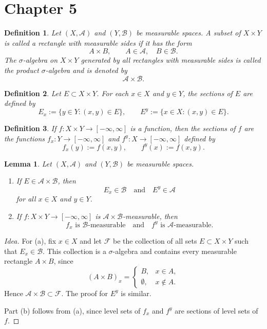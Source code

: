 \documentclass[12pt]{article}
\newtheorem{lemma}{Lemma}
\newtheorem{definition}{Definition}
\begin{document}
\section*{Chapter 5}

\begin{definition}
Let $(X,\mathcal{A})$ and $(Y,\mathcal{B})$ be measurable spaces. A subset of
$X\times Y$ is called a \emph{rectangle with measurable sides} if it has the
form
\[
A\times B,
\qquad A\in\mathcal{A},\quad B\in\mathcal{B}.
\]
The $\sigma$-algebra on $X\times Y$ generated by all rectangles with measurable
sides is called the \emph{product $\sigma$-algebra} and is denoted by
\[
\mathcal{A}\times\mathcal{B}.
\]
\end{definition}

\begin{definition}
Let $E\subset X\times Y$. For each $x\in X$ and $y\in Y$, the \emph{sections}
of $E$ are defined by
\[
E_x:=\{y\in Y:(x,y)\in E\},
\qquad
E^y:=\{x\in X:(x,y)\in E\}.
\]
\end{definition}

\begin{definition}
If $f:X\times Y\to[-\infty,\infty]$ is a function, then the \emph{sections} of
$f$ are the functions $f_x:Y\to[-\infty,\infty]$ and
$f^y:X\to[-\infty,\infty]$ defined by
\[
f_x(y):=f(x,y),
\qquad
f^y(x):=f(x,y).
\]
\end{definition}

\begin{lemma}
Let $(X,\mathcal{A})$ and $(Y,\mathcal{B})$ be measurable spaces.
\begin{enumerate}[label=(\alph*)]
    \item If $E\in\mathcal{A}\times\mathcal{B}$, then
    \[
    E_x\in\mathcal{B}
    \quad\text{and}\quad
    E^y\in\mathcal{A}
    \]
    for all $x\in X$ and $y\in Y$.
    \item If $f:X\times Y\to[-\infty,\infty]$ is
    $\mathcal{A}\times\mathcal{B}$-measurable, then
    \[
    f_x \text{ is } \mathcal{B}\text{-measurable}
    \quad\text{and}\quad
    f^y \text{ is } \mathcal{A}\text{-measurable}.
    \]
\end{enumerate}
\end{lemma}

\begin{proof}[Idea]
For (a), fix $x\in X$ and let $\mathcal{F}$ be the collection of all sets
$E\subset X\times Y$ such that $E_x\in\mathcal{B}$. This collection is a
$\sigma$-algebra and contains every measurable rectangle $A\times B$, since
\[
(A\times B)_x
=
\begin{cases}
B, & x\in A,\\
\emptyset, & x\notin A.
\end{cases}
\]
Hence $\mathcal{A}\times\mathcal{B}\subset\mathcal{F}$. The proof for $E^y$ is
similar.

Part (b) follows from (a), since level sets of $f_x$ and $f^y$ are sections of
level sets of $f$.
\end{proof}
\end{document}
